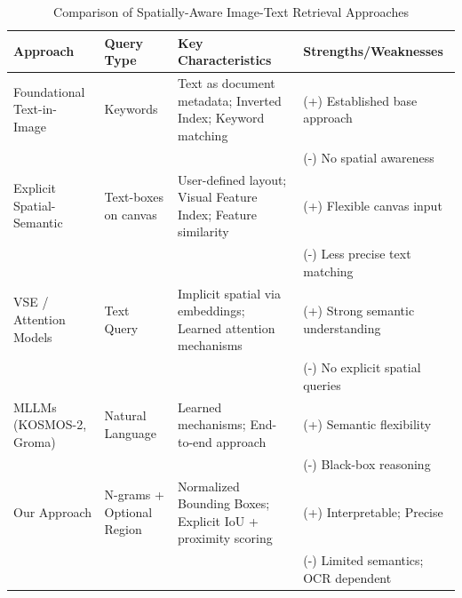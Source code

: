 \documentclass[sigconf,screen]{acmart}
\begin{document}
\begin{table}
    \caption{Comparison of Spatially-Aware Image-Text Retrieval Approaches}
    \label{tab:approaches}
    \begin{tabular}{p{2.8cm}p{2.8cm}p{4.5cm}p{3.4cm}}
        \toprule
        Approach                                     & Query Type                & Key Characteristics                                                           & Strengths/Weaknesses                 \\
        \midrule
        Foundational Text-in-Image~\cite{Manmatha00} & Keywords                  & Text as document metadata; Inverted Index; Keyword matching                   & (+) Established base approach        \\
                                                     &                           &                                                                               & (-) No spatial awareness             \\
        \midrule
        Explicit Spatial-Semantic~\cite{Mai17}       & Text-boxes on canvas      & User-defined layout; Visual Feature Index; Feature similarity                 & (+) Flexible canvas input            \\
                                                     &                           &                                                                               & (-) Less precise text matching       \\
        \midrule
        VSE / Attention Models~\cite{Faghri17}       & Text Query                & Implicit spatial via embeddings; Learned attention mechanisms & (+) Strong semantic understanding    \\
                                                     &                           &                                                                               & (-) No explicit spatial queries      \\
        \midrule
        MLLMs (KOSMOS-2, Groma)                      & Natural Language          & Learned mechanisms; End-to-end approach                                       & (+) Semantic flexibility             \\
                                                     &                           &                                                                               & (-) Black-box reasoning              \\
        \midrule
        Our Approach                                 & N-grams + Optional Region & Normalized Bounding Boxes; Explicit IoU + proximity scoring                   & (+) Interpretable; Precise           \\
                                                     &                           &                                                                               & (-) Limited semantics; OCR dependent \\
        \bottomrule
    \end{tabular}
\end{table}
\end{document}
